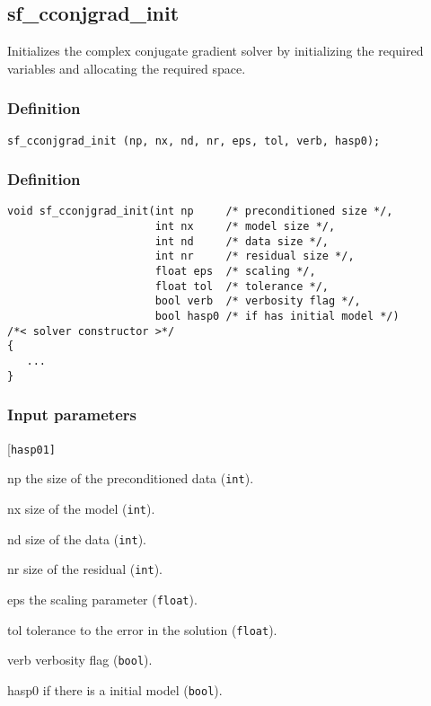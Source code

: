 \subsection{{sf\_cconjgrad\_init}}\label{sec:sf_cconjgrad_init}
Initializes the complex conjugate gradient solver by initializing the required variables and allocating the required space.

\subsubsection*{Definition}
\begin{verbatim}sf_cconjgrad_init (np, nx, nd, nr, eps, tol, verb, hasp0);\end{verbatim}

\subsubsection*{Definition}
\begin{verbatim}
void sf_cconjgrad_init(int np     /* preconditioned size */, 
                       int nx     /* model size */, 
                       int nd     /* data size */, 
                       int nr     /* residual size */, 
                       float eps  /* scaling */,
                       float tol  /* tolerance */, 
                       bool verb  /* verbosity flag */, 
                       bool hasp0 /* if has initial model */) 
/*< solver constructor >*/
{
   ...
}
\end{verbatim}

\subsubsection*{Input parameters}
\begin{desclist}{\tt }{\quad}[\tt hasp01]
   \setlength\itemsep{0pt}
   \item[np]    the size of the preconditioned data (\texttt{int}).  
   \item[nx]    size of the model (\texttt{int}).  
   \item[nd]    size of the data (\texttt{int}).  
   \item[nr]    size of the residual (\texttt{int}).  
   \item[eps]   the scaling parameter (\texttt{float}).  
   \item[tol]   tolerance to the error in the solution  (\texttt{float}).  
   \item[verb]  verbosity flag (\texttt{bool}).  
   \item[hasp0] if there is a initial model (\texttt{bool}).  
\end{desclist}





